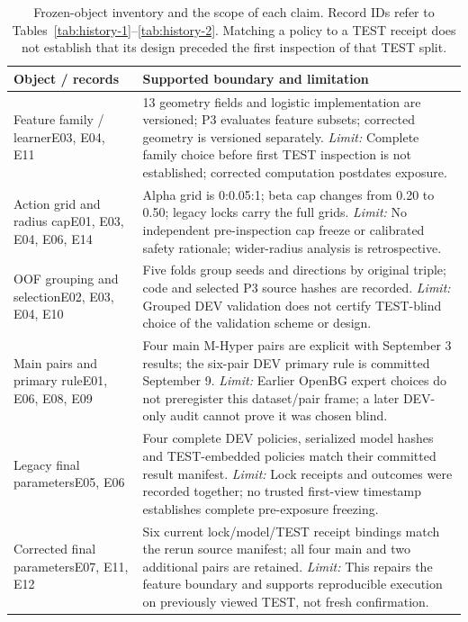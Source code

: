 \begin{table}[tbp]
\centering\footnotesize
\caption{Frozen-object inventory and the scope of each claim. Record IDs refer to Tables~\ref{tab:history-1}--\ref{tab:history-2}. Matching a policy to a TEST receipt does not establish that its design preceded the first inspection of that TEST split.}
\label{tab:history-objects}
\begin{tabularx}{\linewidth}{@{}p{.23\linewidth}X@{}}
\toprule
Object / records & Supported boundary and limitation\\
\midrule
Feature family / learner\newline E03, E04, E11 & 13 geometry fields and logistic implementation are versioned; P3 evaluates feature subsets; corrected geometry is versioned separately. \emph{Limit:} Complete family choice before first TEST inspection is not established; corrected computation postdates exposure.\\[3pt]
Action grid and radius cap\newline E01, E03, E04, E06, E14 & Alpha grid is 0:0.05:1; beta cap changes from 0.20 to 0.50; legacy locks carry the full grids. \emph{Limit:} No independent pre-inspection cap freeze or calibrated safety rationale; wider-radius analysis is retrospective.\\[3pt]
OOF grouping and selection\newline E02, E03, E04, E10 & Five folds group seeds and directions by original triple; code and selected P3 source hashes are recorded. \emph{Limit:} Grouped DEV validation does not certify TEST-blind choice of the validation scheme or design.\\[3pt]
Main pairs and primary rule\newline E01, E06, E08, E09 & Four main M-Hyper pairs are explicit with September 3 results; the six-pair DEV primary rule is committed September 9. \emph{Limit:} Earlier OpenBG expert choices do not preregister this dataset/pair frame; a later DEV-only audit cannot prove it was chosen blind.\\[3pt]
Legacy final parameters\newline E05, E06 & Four complete DEV policies, serialized model hashes and TEST-embedded policies match their committed result manifest. \emph{Limit:} Lock receipts and outcomes were recorded together; no trusted first-view timestamp establishes complete pre-exposure freezing.\\[3pt]
Corrected final parameters\newline E07, E11, E12 & Six current lock/model/TEST receipt bindings match the rerun source manifest; all four main and two additional pairs are retained. \emph{Limit:} This repairs the feature boundary and supports reproducible execution on previously viewed TEST, not fresh confirmation.\\[3pt]

\end{tabularx}
\end{table}
